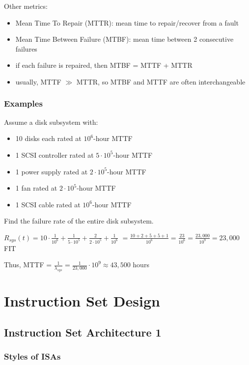 \documentclass[12pt]{extarticle}
\begin{document}
	Other metrics:

	\begin{itemize}
		\item Mean Time To Repair (MTTR): mean time to repair/recover from a fault
		\item Mean Time Between Failure (MTBF): mean time between 2 consecutive failures
		\item if each failure is repaired, then MTBF = MTTF + MTTR
		\item usually, MTTF $\gg$ MTTR, so MTBF and MTTF are often interchangeable
	\end{itemize}

	\subsubsection{Examples}

	Assume a disk subsystem with:

	\begin{itemize}
		\item 10 disks each rated at $10^6$-hour MTTF
		\item 1 SCSI controller rated at $5 \cdot 10^5$-hour MTTF
		\item 1 power supply rated at $2 \cdot 10^5$-hour MTTF
		\item 1 fan rated at $2 \cdot 10^5$-hour MTTF
		\item 1 SCSI cable rated at $10^6$-hour MTTF
	\end{itemize}

	Find the failure rate of the entire disk subsystem.

	$R_{sys}(t) = 10 \cdot \frac{1}{10^6} + \frac{1}{5 \cdot 10^5} + \frac{2}{2 \cdot 10^5} + \frac{1}{10^6}$
	$			= \frac{10 + 2 + 5 + 5 + 1}{10^6} = \frac{23}{10^6} = \frac{23,000}{10^9} = 23,000$ FIT

	Thus, MTTF = $\frac{1}{\lambda_{sys}} = \frac{1}{23,000} \cdot 10^9 \approx 43,500$ hours

	\section{Instruction Set Design}

	\subsection{Instruction Set Architecture 1}

	\subsubsection{Styles of ISAs}
\end{document}

